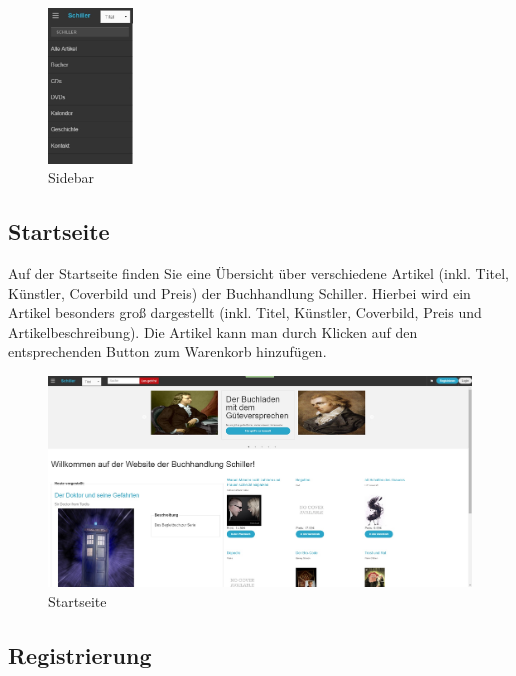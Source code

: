 \documentclass[a4paper]{article}
\begin{document}
\begin{figure}[ht]
\centering
\includegraphics[width=0.2\textwidth]{Sidebar.jpg}
\caption{Sidebar}
\end{figure}
\smallskip

\FloatBarrier

\subsection{Startseite} \label{startseite} 

Auf der Startseite finden Sie eine Übersicht über verschiedene Artikel (inkl. Titel, Künstler, Coverbild und Preis) der Buchhandlung Schiller. Hierbei wird ein Artikel besonders groß dargestellt (inkl. Titel, Künstler, Coverbild, Preis und Artikelbeschreibung). Die Artikel kann man durch Klicken auf den entsprechenden Button zum Warenkorb hinzufügen. \\

\begin{figure}[ht]
\centering
\includegraphics[width=1.0\textwidth]{Startseite.jpg}
\caption{Startseite}
\end{figure}
\smallskip

\FloatBarrier

\subsection{Registrierung}
\end{document}
